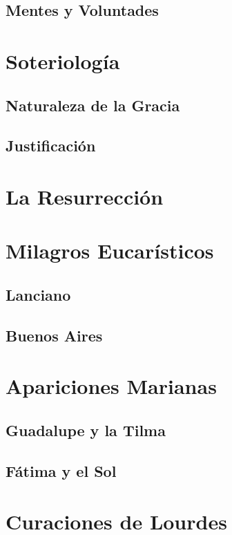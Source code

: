\documentclass[12pt]{report}
\begin{document}
	\subsection{Mentes y Voluntades}
	
	\section{Soteriología}
	\subsection{Naturaleza de la Gracia}
	\subsection{Justificación}
	
	
	\section{La Resurrección}
	\section{Milagros Eucarísticos}
	\subsection{Lanciano}
	\subsection{Buenos Aires}
	\section{Apariciones Marianas}
	\subsection{Guadalupe y la Tilma}
	\subsection{Fátima y el Sol}
	\section{Curaciones de Lourdes}
	
	


	
\end{document}
